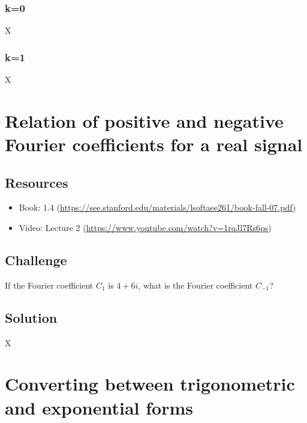 
\subsubsection{k=0}
X


\subsubsection{k=1}
X





\newpage

\section{Relation of positive and negative Fourier coefficients for a real signal}

\subsection*{Resources}
\begin{itemize}
    \item Book: 1.4 (\url{https://see.stanford.edu/materials/lsoftaee261/book-fall-07.pdf})
    \item Video: Lecture 2 (\url{https://www.youtube.com/watch?v=1rqJl7Rs6ps})
\end{itemize}

\subsection*{Challenge}
If the Fourier coefficient $C_1$ is $4 + 6i$, what is the Fourier coefficient $C_{-1}$?

\subsection*{Solution}
X





\newpage

\section{Converting between trigonometric and exponential forms}
\label{sec:trigexpconvert}

